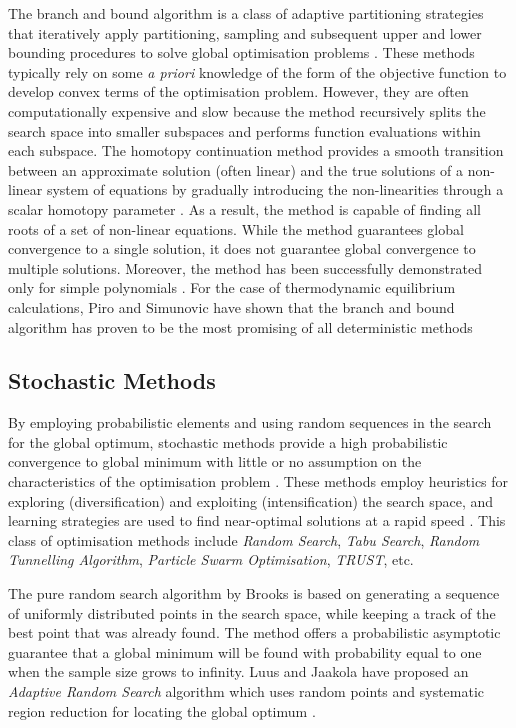 	The branch and bound algorithm is a class of adaptive partitioning strategies that iteratively apply partitioning, sampling and subsequent upper and lower bounding procedures to solve global optimisation problems \cite{Floudas99}.  These methods typically rely on some \textit{a priori} knowledge of the form of the objective function to  develop convex terms of the optimisation problem. However, they are often computationally expensive and slow \cite{Wakeham04,Nichita02} because the method recursively splits the search space into smaller subspaces and performs function evaluations within each subspace. The homotopy continuation method provides a smooth transition between an approximate solution (often linear) and the true solutions of a non-linear system of equations by gradually introducing the non-linearities through a scalar homotopy parameter \cite{B.-Riggs:1994aa,JALALI20082333}. As a result, the method is capable of finding all roots of a set of non-linear equations. While the method guarantees global convergence to a single solution, it does not guarantee global convergence to multiple solutions. Moreover, the method has been successfully demonstrated only for simple polynomials \cite{Zhang11}.
For the case of thermodynamic equilibrium calculations, Piro and Simunovic \cite{Piro16} have shown that the branch and bound algorithm has proven to be the most promising of all deterministic methods




	\subsection{Stochastic Methods}
	By employing probabilistic elements and using random sequences in the search for the global optimum, stochastic methods  provide a high probabilistic convergence to global minimum with little or no assumption on the characteristics of the optimisation problem \cite{Rangaiah:2010aa}. These methods employ heuristics for exploring (diversification) and exploiting (intensification) the search space, and learning strategies are used to find near-optimal solutions at a rapid speed \cite{Blum:2003aa}. This class of optimisation methods include \emph{Random Search}, \emph{Tabu Search}, \emph{Random Tunnelling Algorithm}, \emph{Particle Swarm Optimisation}, \emph{TRUST}, etc.

	The pure random search algorithm by Brooks \cite{Brooks:1958aa} is based on generating a sequence of uniformly distributed points in the search space, while keeping a track of the best point that was already found. The method offers a probabilistic asymptotic guarantee that a global minimum will be found with probability equal to one when the sample size grows to infinity. Luus and Jaakola have proposed an \emph{Adaptive Random Search} algorithm which uses random points and systematic region reduction for locating the global optimum \cite{Luus:1973aa}.

